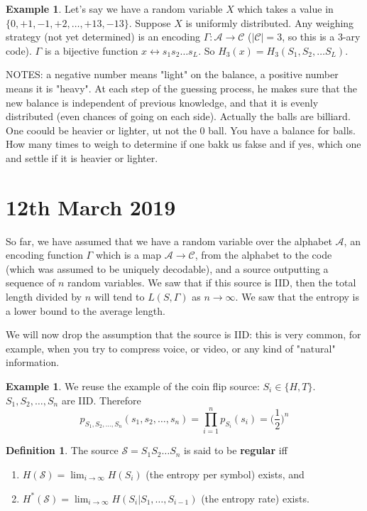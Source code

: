 \documentclass{report}
\theoremstyle{plain}
\theoremstyle{definition}
\newtheorem{exmp}[thm]{Example}
\newtheorem{defn}[thm]{Definition}
\theoremstyle{remark}
\begin{document}
 \begin{exmp}
 	Let's say we have a random variable $X$ which takes a value in $\{0, +1, -1, +2, \ldots, +13, -13\}$. Suppose $X$ is uniformly distributed. Any weighing strategy (not yet determined) is an encoding $\Gamma: \mathcal A \to \mathcal C$ ($|\mathcal C| = 3$, so this is a $3$-ary code). $\Gamma$ is a bijective function $x \leftrightarrow s_1 s_2\ldots s_L$. So $H_3(x) = H_3(S_1, S_2, \ldots S_L)$.
 \end{exmp}
NOTES: a negative number means "light" on the balance, a positive number means it is "heavy". At each step of the guessing process, he makes sure that the new balance is independent of previous knowledge, and that it is evenly distributed (even chances of going on each side). Actually the balls are billiard.
 One coould be heavier or lighter, ut not the 0 ball. You have a balance for balls. How many times to weigh to determine if one bakk us fakse and if yes, which one and settle if it is heavier or lighter.

\section{12th March 2019}
So far, we have assumed that we have a random variable over the alphabet $\mathcal A$, an encoding function $\Gamma$ which is a map $\mathcal A \to \mathcal C$, from the alphabet to the code (which was assumed to be uniquely decodable), and a source outputting a sequence of $n$ random variables. We saw that if this source is IID, then the total length divided by $n$ will tend to $L(S, \Gamma)$ as $n \to \infty$. We saw that the entropy is a lower bound to the average length. \par
We will now drop the assumption that the source is IID: this is very common, for example, when you try to compress voice, or video, or any kind of "natural" information. 

\begin{exmp}
	We reuse the example of the coin flip source: $S_i \in \{H, T\}$. $S_1, S_2, \ldots, S_n$ are IID. Therefore 
	\begin{equation*}
	p_{S_1, S_2, \ldots, S_n}(s_1, s_2, \ldots, s_n) = \prod_{i=1}^n p_{S_i}(s_i) = \bigl(\frac12\bigr)^n
	\end{equation*}
\end{exmp}

\begin{defn}
	The source $\mathcal S = S_1 S_2 \ldots S_n$ is said to be \textbf{regular} iff
	\begin{enumerate}
		\item $H(\mathcal S) = \lim_{i \to \infty} H(S_i)$ (the entropy per symbol) exists, and
		\item $H^*(\mathcal S) = \lim_{i \to \infty} H(S_i | S_1, \ldots, S_{i-1})$ (the entropy rate) exists.
	\end{enumerate}
\end{defn}
\end{document}
